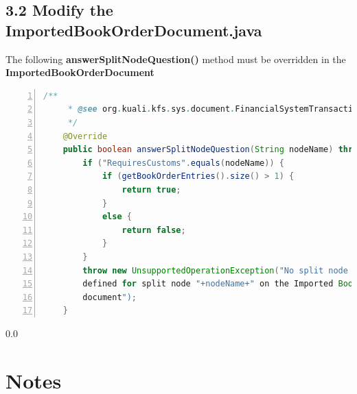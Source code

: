 \subsection*{3.2 Modify the ImportedBookOrderDocument.java}
The following \textbf{answerSplitNodeQuestion()} method must be overridden in the \textbf{ImportedBookOrderDocument}
\begin{lstlisting}[numbers=left,language=java,basicstyle=\scriptsize,backgroundcolor=\color{ubergray},caption={New
  KIM Type},frame=single,breaklines=true]
    /**
     * @see org.kuali.kfs.sys.document.FinancialSystemTransactionalDocumentBase#answerSplitNodeQuestion(java.lang.String)
     */
    @Override
    public boolean answerSplitNodeQuestion(String nodeName) throws UnsupportedOperationException {
        if ("RequiresCustoms".equals(nodeName)) {
            if (getBookOrderEntries().size() > 1) {
                return true;
            }
            else {
                return false;
            }
        }
        throw new UnsupportedOperationException("No split node logic
        defined for split node "+nodeName+" on the Imported Book Order
        document");
    }
\end{lstlisting}


\newpage
  {\setlength{\baselineskip}%
           {0.0\baselineskip}
  \section*{Notes}
  \hrulefill \par}